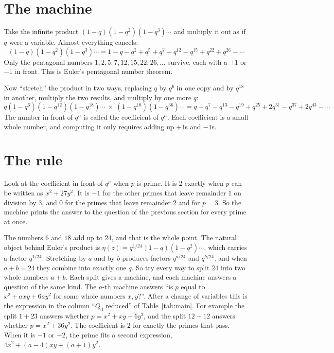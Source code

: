 \documentclass[11pt]{amsart}
\theoremstyle{definition}
\theoremstyle{remark}
\begin{document}
\section{The machine}

Take the infinite product $(1-q)(1-q^2)(1-q^3)\cdots$ and multiply it out as if $q$ were a variable. Almost everything cancels:
\[
(1-q)(1-q^2)(1-q^3)\cdots = 1-q-q^2+q^5+q^7-q^{12}-q^{15}+q^{22}+q^{26}-\cdots
\]
Only the pentagonal numbers $1,2,5,7,12,15,22,26,\dots$ survive, each with a $+1$ or $-1$ in front. This is Euler's pentagonal number theorem.

Now ``stretch'' the product in two ways, replacing $q$ by $q^6$ in one copy and by $q^{18}$ in another, multiply the two results, and multiply by one more $q$:
\[
q(1-q^6)(1-q^{12})(1-q^{18})\cdots\ \times\ (1-q^{18})(1-q^{36})\cdots
= q-q^7-q^{13}-q^{19}+q^{25}+2q^{31}-q^{37}+2q^{43}-\cdots
\]
The number in front of $q^n$ is called the coefficient of $q^n$. Each coefficient is a small whole number, and computing it only requires adding up $+1$s and $-1$s.

\section{The rule}

Look at the coefficient in front of $q^p$ when $p$ is prime. It is $2$ exactly when $p$ can be written as $x^2+27y^2$. It is $-1$ for the other primes that leave remainder $1$ on division by $3$, and $0$ for the primes that leave remainder $2$ and for $p=3$. So the machine prints the answer to the question of the previous section for every prime at once.

The numbers $6$ and $18$ add up to $24$, and that is the whole point. The natural object behind Euler's product is $\eta(z)=q^{1/24}(1-q)(1-q^2)\cdots$, which carries a factor $q^{1/24}$. Stretching by $a$ and by $b$ produces factors $q^{a/24}$ and $q^{b/24}$, and when $a+b=24$ they combine into exactly one $q$. So try every way to split $24$ into two whole numbers $a+b$. Each split gives a machine, and each machine answers a question of the same kind. The $a$-th machine answers ``is $p$ equal to $x^2+axy+6ay^2$ for some whole numbers $x,y$?''. After a change of variables this is the expression in the column ``$Q_0$ reduced'' of Table~\ref{tab:main}. For example the split $1+23$ answers whether $p=x^2+xy+6y^2$, and the split $12+12$ answers whether $p=x^2+36y^2$. The coefficient is $2$ for exactly the primes that pass. When it is $-1$ or $-2$, the prime fits a second expression, $4x^2+(a-4)xy+(a+1)y^2$.
\end{document}
